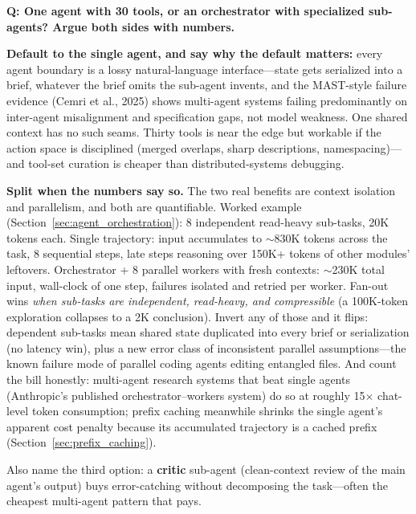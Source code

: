 \begin{interviewq}
\textbf{Q: One agent with 30 tools, or an orchestrator with specialized sub-agents? Argue both sides with numbers.}

 \quad {} \quad \badgefreq{\freqmed}

\stronganswer

\textbf{Default to the single agent, and say why the default matters:} every agent boundary is a lossy natural-language interface---state gets serialized into a brief, whatever the brief omits the sub-agent invents, and the MAST-style failure evidence (Cemri et al., 2025) shows multi-agent systems failing predominantly on inter-agent misalignment and specification gaps, not model weakness. One shared context has no such seams. Thirty tools is near the edge but workable if the action space is disciplined (merged overlaps, sharp descriptions, namespacing)---and tool-set curation is cheaper than distributed-systems debugging.

\textbf{Split when the numbers say so.} The two real benefits are context isolation and parallelism, and both are quantifiable. Worked example (Section~\ref{sec:agent_orchestration}): 8 independent read-heavy sub-tasks, 20K tokens each. Single trajectory: input accumulates to $\sim$830K tokens across the task, 8 sequential steps, late steps reasoning over 150K+ tokens of other modules' leftovers. Orchestrator + 8 parallel workers with fresh contexts: $\sim$230K total input, wall-clock of one step, failures isolated and retried per worker. Fan-out wins \textit{when sub-tasks are independent, read-heavy, and compressible} (a 100K-token exploration collapses to a 2K conclusion). Invert any of those and it flips: dependent sub-tasks mean shared state duplicated into every brief or serialization (no latency win), plus a new error class of inconsistent parallel assumptions---the known failure mode of parallel coding agents editing entangled files. And count the bill honestly: multi-agent research systems that beat single agents (Anthropic's published orchestrator--workers system) do so at roughly 15$\times$ chat-level token consumption; prefix caching meanwhile shrinks the single agent's apparent cost penalty because its accumulated trajectory is a cached prefix (Section~\ref{sec:prefix_caching}).

Also name the third option: a \textbf{critic} sub-agent (clean-context review of the main agent's output) buys error-catching without decomposing the task---often the cheapest multi-agent pattern that pays.


\end{interviewq}
